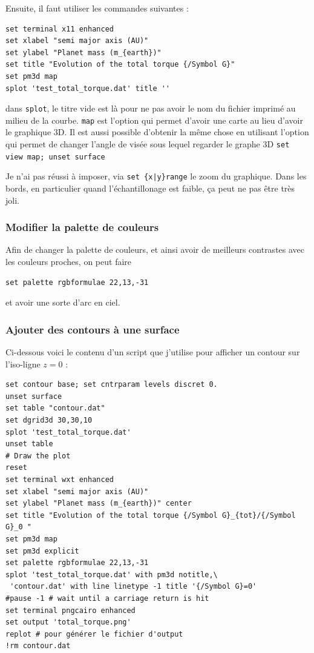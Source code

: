 \documentclass[a4paper,twoside]{article}
\begin{document}
Ensuite, il faut utiliser les commandes suivantes :
\begin{verbatim}
set terminal x11 enhanced
set xlabel "semi major axis (AU)"
set ylabel "Planet mass (m_{earth})"
set title "Evolution of the total torque {/Symbol G}"
set pm3d map
splot 'test_total_torque.dat' title ''
\end{verbatim}
dans \texttt{splot}, le titre vide est là pour ne pas avoir le nom du fichier imprimé au milieu de la courbe. \texttt{map} est l'option qui permet d'avoir une carte au lieu d'avoir le graphique 3D. Il est aussi possible d'obtenir la même chose en utilisant l'option qui permet de changer l'angle de visée sous lequel regarder le graphe 3D \texttt{set view map; unset surface}

\begin{remarque}
Je n'ai pas réussi à imposer, via \verb#set {x|y}range# le zoom du graphique. Dans les bords, en particulier quand l'échantillonage est faible, ça peut ne pas être très joli. 
\end{remarque}

\subsubsection{Modifier la palette de couleurs}
Afin de changer la palette de couleurs, et ainsi avoir de meilleurs contrastes avec les couleurs proches, on peut faire 
\begin{verbatim}
set palette rgbformulae 22,13,-31
\end{verbatim}
et avoir une sorte d'arc en ciel.

\subsubsection{Ajouter des contours à une surface}\label{sec:contour}
Ci-dessous voici le contenu d'un script que j'utilise pour afficher un contour sur l'iso-ligne $z=0$ : 
\begin{verbatim}
set contour base; set cntrparam levels discret 0.
unset surface
set table "contour.dat"
set dgrid3d 30,30,10
splot 'test_total_torque.dat'
unset table
# Draw the plot
reset
set terminal wxt enhanced
set xlabel "semi major axis (AU)"
set ylabel "Planet mass (m_{earth})" center
set title "Evolution of the total torque {/Symbol G}_{tot}/{/Symbol G}_0 "
set pm3d map
set pm3d explicit
set palette rgbformulae 22,13,-31
splot 'test_total_torque.dat' with pm3d notitle,\
 'contour.dat' with line linetype -1 title '{/Symbol G}=0'
#pause -1 # wait until a carriage return is hit
set terminal pngcairo enhanced
set output 'total_torque.png'
replot # pour générer le fichier d'output
!rm contour.dat
\end{verbatim}
\end{document}
